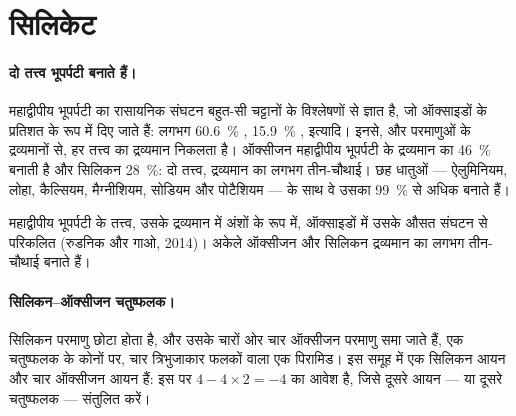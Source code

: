 \section{सिलिकेट}

\paragraph{दो तत्त्व भूपर्पटी बनाते हैं।} महाद्वीपीय भूपर्पटी का
रासायनिक संघटन बहुत-सी चट्टानों के विश्लेषणों से ज्ञात है, जो
ऑक्साइडों के प्रतिशत के रूप में दिए जाते हैं: लगभग \qty{60.6}{\percent} ,
\qty{15.9}{\percent} , इत्यादि। इनसे, और परमाणुओं के
द्रव्यमानों से, हर तत्त्व का द्रव्यमान निकलता है। ऑक्सीजन महाद्वीपीय भूपर्पटी के द्रव्यमान का
\qty{46}{\percent} बनाती है और सिलिकन \qty{28}{\percent}: दो
तत्त्व, द्रव्यमान का लगभग तीन-चौथाई। छह धातुओं --- ऐलुमिनियम,
लोहा, कैल्सियम, मैग्नीशियम, सोडियम और पोटैशियम --- के साथ वे उसका
\qty{99}{\percent} से अधिक बनाते हैं।

\begin{omfigure}

{\small महाद्वीपीय भूपर्पटी के तत्त्व, उसके द्रव्यमान में अंशों के रूप में,
ऑक्साइडों में उसके औसत संघटन से परिकलित (रुडनिक और गाओ, 2014)।
अकेले ऑक्सीजन और सिलिकन द्रव्यमान का लगभग तीन-चौथाई बनाते हैं।}
\end{omfigure}

\paragraph{सिलिकन--ऑक्सीजन चतुष्फलक।} सिलिकन परमाणु छोटा होता है, और
उसके चारों ओर चार ऑक्सीजन परमाणु समा जाते हैं, एक चतुष्फलक के कोनों पर, चार
त्रिभुजाकार फलकों वाला एक पिरामिड। इस समूह में एक सिलिकन आयन  और
चार ऑक्सीजन आयन  हैं: इस पर $4 - 4 \times 2 = -4$ का आवेश है,
जिसे दूसरे आयन --- या दूसरे चतुष्फलक --- संतुलित करें।

